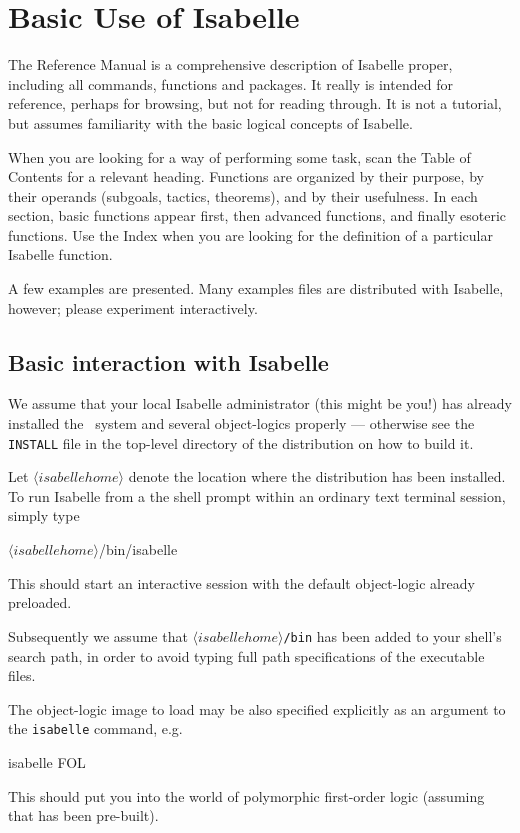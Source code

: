 

\chapter{Basic Use of Isabelle} 
The Reference Manual is a comprehensive description of Isabelle
proper, including all \ML{} commands, functions and packages.  It
really is intended for reference, perhaps for browsing, but not for
reading through.  It is not a tutorial, but assumes familiarity with
the basic logical concepts of Isabelle.

When you are looking for a way of performing some task, scan the Table of
Contents for a relevant heading.  Functions are organized by their purpose,
by their operands (subgoals, tactics, theorems), and by their usefulness.
In each section, basic functions appear first, then advanced functions, and
finally esoteric functions.  Use the Index when you are looking for the
definition of a particular Isabelle function.

A few examples are presented.  Many examples files are distributed with
Isabelle, however; please experiment interactively.


\section{Basic interaction with Isabelle}
\nobreak
%
We assume that your local Isabelle administrator (this might be you!)
has already installed the \Pure\ system and several object-logics
properly --- otherwise see the {\tt INSTALL} file in the top-level
directory of the distribution on how to build it.

\medskip Let $\langle isabellehome \rangle$ denote the location where
the distribution has been installed.  To run Isabelle from a the shell
prompt within an ordinary text terminal session, simply type
\begin{ttbox}
\({\langle}isabellehome{\rangle}\)/bin/isabelle
\end{ttbox}
This should start an interactive \ML{} session with the default
object-logic already preloaded.

Subsequently we assume that {\tt \(\langle isabellehome \rangle\)/bin}
has been added to your shell's search path, in order to avoid typing
full path specifications of the executable files.

The object-logic image to load may be also specified explicitly as an
argument to the {\tt isabelle} command, e.g.
\begin{ttbox}
isabelle FOL
\end{ttbox}
This should put you into the world of polymorphic first-order logic
(assuming that {\FOL} has been pre-built).

